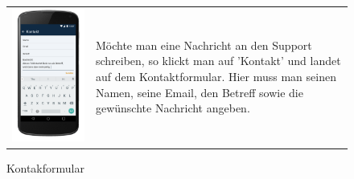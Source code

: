 \begin{figure}[h]
\begin{tabularx}{\textwidth}{X  X}
	\includegraphics[scale = 0.155]{img/AndroidMockup/contact} \caption{Kontakformular} & Möchte man eine Nachricht an den Support schreiben, so klickt man auf 'Kontakt' und landet auf dem Kontaktformular. Hier muss man seinen Namen, seine Email, den Betreff sowie die gewünschte Nachricht angeben. \\ 
\end{tabularx}
\end{figure} 

